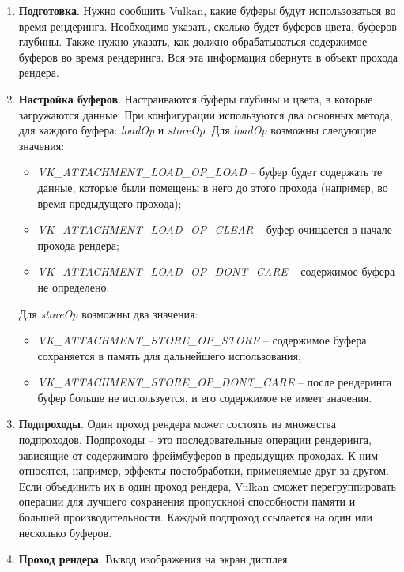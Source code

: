 \begin{enumerate}
    \item \textbf{Подготовка}. Нужно сообщить Vulkan, какие буферы будут использоваться во время рендеринга. Необходимо указать, сколько будет буферов цвета, буферов глубины. Также нужно указать, как должно обрабатываться содержимое буферов во время рендеринга. Вся эта информация обернута в объект прохода рендера.
    \item \textbf{Настройка буферов}. Настраиваются буферы глубины и цвета, в которые загружаются данные. При конфигурации используются два основных метода, для каждого буфера: \textit{loadOp} и \textit{storeOp}. Для \textit{loadOp} возможны следующие значения:
    \begin{itemize}
        \item \textit{VK\_ATTACHMENT\_LOAD\_OP\_LOAD} -- буфер будет содержать те данные, которые были помещены в него до этого прохода (например, во время предыдущего прохода);
        \item \textit{VK\_ATTACHMENT\_LOAD\_OP\_CLEAR} -- буфер очищается в начале прохода рендера;
        \item \textit{VK\_ATTACHMENT\_LOAD\_OP\_DONT\_CARE} -- содержимое буфера не определено.
    \end{itemize}

    Для \textit{storeOp} возможны два значения:
    \begin{itemize}
        \item \textit{VK\_ATTACHMENT\_STORE\_OP\_STORE} -- содержимое буфера сохраняется в память для дальнейшего использования;
        \item \textit{VK\_ATTACHMENT\_STORE\_OP\_DONT\_CARE} -- после рендеринга буфер больше не используется, и его содержимое не имеет значения.
    \end{itemize}
    \item \textbf{Подпроходы}. Один проход рендера может состоять из множества подпроходов. Подпроходы -- это последовательные операции рендеринга, зависящие от содержимого фреймбуферов в предыдущих проходах. К ним относятся, например, эффекты постобработки, применяемые друг за другом. Если объединить их в один проход рендера, Vulkan сможет перегруппировать операции для лучшего сохранения пропускной способности памяти и большей производительности. Каждый подпроход ссылается на один или несколько буферов.
    \item \textbf{Проход рендера}. Вывод изображения на экран дисплея.
\end{enumerate}


